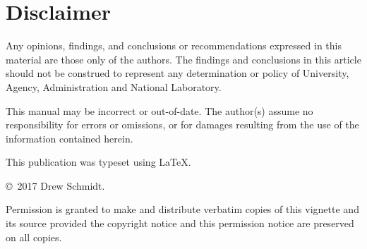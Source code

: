 \section*{Disclaimer}
Any opinions, findings, and conclusions or recommendations expressed in this 
material are those only of the authors.  The findings and conclusions in this 
article should not be construed to represent any determination or policy of
University, Agency, Administration and National Laboratory.


This manual may be incorrect or out-of-date.  The author(s) assume
no responsibility for errors or omissions, or for damages resulting
from the use of the information contained herein.

This publication was typeset using \LaTeX.

\vfill

\null
\vfill
\copyright\ 2017 Drew Schmidt.

Permission is granted to make and distribute verbatim copies of
this vignette and its source provided the copyright notice and
this permission notice are preserved on all copies.
